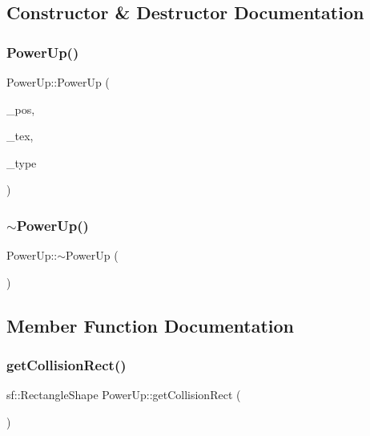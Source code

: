 \subsection{Constructor \& Destructor Documentation}
\mbox{\label{class_power_up_abf0ff839909cf8d07ba12a29b800ae52}} 
\subsubsection{\texorpdfstring{Power\+Up()}{PowerUp()}}
{\footnotesize\ttfamily Power\+Up\+::\+Power\+Up (\begin{DoxyParamCaption}\item[{sf\+::\+Vector2f}]{\+\_\+pos,  }\item[{sf\+::\+Texture}]{\+\_\+tex,  }\item[{\hyperlink{_power_up_type_8h_a5508eb40af0ccc4bb1b781eaf743176c}{Power\+U\+P\+Type}}]{\+\_\+type }\end{DoxyParamCaption})}

\mbox{\label{class_power_up_a353053fe27c5a148a2fcd4f5f45e19af}} 
\subsubsection{\texorpdfstring{$\sim$\+Power\+Up()}{~PowerUp()}}
{\footnotesize\ttfamily Power\+Up\+::$\sim$\+Power\+Up (\begin{DoxyParamCaption}{ }\end{DoxyParamCaption})}



\subsection{Member Function Documentation}
\mbox{\label{class_power_up_a4a0eeee44d665fc8878fa2a9a603edd9}} 
\subsubsection{\texorpdfstring{get\+Collision\+Rect()}{getCollisionRect()}}
{\footnotesize\ttfamily sf\+::\+Rectangle\+Shape Power\+Up\+::get\+Collision\+Rect (\begin{DoxyParamCaption}{ }\end{DoxyParamCaption})}

